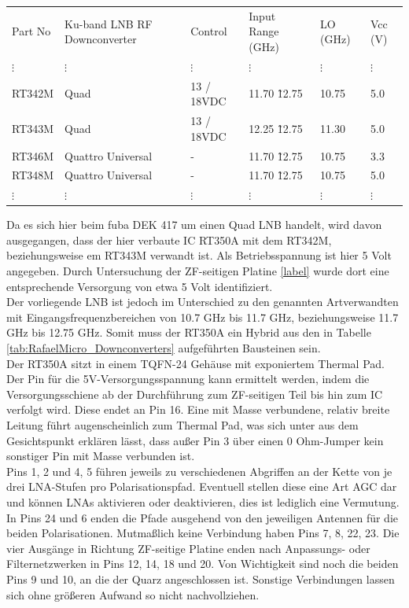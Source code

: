 \documentclass[]{article}
\begin{document}
		
		\begin{minipage}{\textwidth}
			{\scriptsize
				\begin{tabular}{llllll}
					Part No & Ku-band LNB RF Downconverter & Control & Input Range (GHz) & LO (GHz) & Vcc (V)\\
					$\vdots$ & $\vdots$ & $\vdots$ & $\vdots$ & $\vdots$ & $\vdots$\\
					RT342M & Quad & 13 / 18VDC & 11.70 \~ 12.75 & 10.75 & 5.0\\
					RT343M & Quad & 13 / 18VDC & 12.25 \~ 12.75 & 11.30 & 5.0\\
					RT346M & Quattro Universal & - & 11.70 \~ 12.75 & 10.75 & 3.3\\
					RT348M & Quattro Universal & - & 11.70 \~ 12.75 & 10.75 & 5.0\\
					$\vdots$ & $\vdots$ & $\vdots$ & $\vdots$ & $\vdots$ & $\vdots$
				\end{tabular}
			}
		\end{minipage}
		
		
		\noindent Da es sich hier beim fuba DEK 417 um einen Quad LNB handelt, wird davon ausgegangen, dass der hier verbaute IC RT350A mit dem RT342M, beziehungsweise em RT343M verwandt ist. Als Betriebsspannung ist hier 5 Volt angegeben. Durch Untersuchung der ZF-seitigen Platine \ref{label} wurde dort eine entsprechende Versorgung von etwa 5 Volt identifiziert.\\
		
		\noindent Der vorliegende LNB ist jedoch im Unterschied zu den genannten Artverwandten mit Eingangsfrequenzbereichen von 10.7 GHz bis 11.7 GHz, beziehungsweise 11.7 GHz bis 12.75 GHz. Somit muss der RT350A ein Hybrid aus den in Tabelle \ref{tab:RafaelMicro_Downconverters} aufgeführten Bausteinen sein.\\
		
		\noindent Der RT350A sitzt in einem TQFN-24 Gehäuse mit exponiertem Thermal Pad. Der Pin für die 5V-Versorgungsspannung kann ermittelt werden, indem die Versorgungsschiene ab der Durchführung zum ZF-seitigen Teil bis hin zum IC verfolgt wird. Diese endet an Pin 16. Eine mit Masse verbundene, relativ breite Leitung führt augenscheinlich zum Thermal Pad, was sich unter aus dem Gesichtspunkt erklären lässt, dass außer Pin 3 über einen 0 Ohm-Jumper kein sonstiger Pin mit Masse verbunden ist.\\
		
		\noindent Pins 1, 2 und 4, 5 führen jeweils zu verschiedenen Abgriffen an der Kette von je drei LNA-Stufen pro Polarisationspfad. Eventuell stellen diese eine Art AGC dar und können LNAs aktivieren oder deaktivieren, dies ist lediglich eine Vermutung. In Pins 24 und 6 enden die Pfade ausgehend von den jeweiligen Antennen für die beiden Polarisationen. Mutmaßlich keine Verbindung haben Pins 7, 8, 22, 23. Die vier Ausgänge in Richtung ZF-seitige Platine enden nach Anpassungs- oder Filternetzwerken in Pins 12, 14, 18 und 20. Von Wichtigkeit sind noch die beiden Pins 9 und 10, an die der Quarz angeschlossen ist. Sonstige Verbindungen lassen sich ohne größeren Aufwand so nicht nachvollziehen.
	
\end{document}
